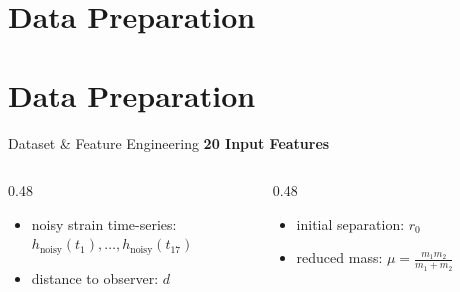 \documentclass[aspectratio=169]{beamer}
\begin{document}
\section{Data Preparation}

\section{Data Preparation}

\begin{frame}{Dataset \& Feature Engineering}
  \textbf{20 Input Features}
  \begin{columns}[t]
    \begin{column}{0.48\textwidth}
      \begin{itemize}
        \item noisy strain time-series: \\ $h_\text{noisy}(t_1), \ldots, h_\text{noisy}(t_{17})$ 
        \vspace{0.2cm}
        \item distance to observer: $d$
      \end{itemize}
    \end{column}
    \begin{column}{0.48\textwidth}
      \begin{itemize}
        \item initial separation: $r_0$
        \vspace{0.2cm}
        \item reduced mass: $\mu = \frac{m_1 m_2}{m_1+m_2}$
      \end{itemize}
    \end{column}
  \end{columns}
 

\end{frame}
\end{document}
